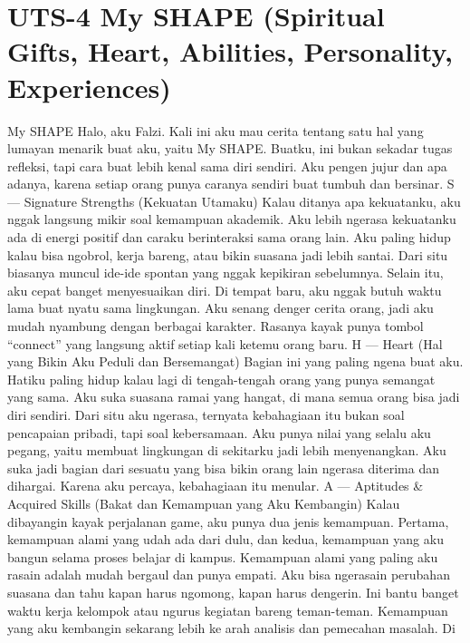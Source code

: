 \documentclass[
  letterpaper,
  DIV=11,
  numbers=noendperiod]{scrreprt}
\begin{document}

\chapter{UTS-4 My SHAPE (Spiritual Gifts, Heart, Abilities, Personality,
Experiences)}\label{uts-4-my-shape-spiritual-gifts-heart-abilities-personality-experiences}

My SHAPE Halo, aku Falzi. Kali ini aku mau cerita tentang satu hal yang
lumayan menarik buat aku, yaitu My SHAPE. Buatku, ini bukan sekadar
tugas refleksi, tapi cara buat lebih kenal sama diri sendiri. Aku pengen
jujur dan apa adanya, karena setiap orang punya caranya sendiri buat
tumbuh dan bersinar. S --- Signature Strengths (Kekuatan Utamaku) Kalau
ditanya apa kekuatanku, aku nggak langsung mikir soal kemampuan
akademik. Aku lebih ngerasa kekuatanku ada di energi positif dan caraku
berinteraksi sama orang lain. Aku paling hidup kalau bisa ngobrol, kerja
bareng, atau bikin suasana jadi lebih santai. Dari situ biasanya muncul
ide-ide spontan yang nggak kepikiran sebelumnya. Selain itu, aku cepat
banget menyesuaikan diri. Di tempat baru, aku nggak butuh waktu lama
buat nyatu sama lingkungan. Aku senang denger cerita orang, jadi aku
mudah nyambung dengan berbagai karakter. Rasanya kayak punya tombol
``connect'' yang langsung aktif setiap kali ketemu orang baru. H ---
Heart (Hal yang Bikin Aku Peduli dan Bersemangat) Bagian ini yang paling
ngena buat aku. Hatiku paling hidup kalau lagi di tengah-tengah orang
yang punya semangat yang sama. Aku suka suasana ramai yang hangat, di
mana semua orang bisa jadi diri sendiri. Dari situ aku ngerasa, ternyata
kebahagiaan itu bukan soal pencapaian pribadi, tapi soal kebersamaan.
Aku punya nilai yang selalu aku pegang, yaitu membuat lingkungan di
sekitarku jadi lebih menyenangkan. Aku suka jadi bagian dari sesuatu
yang bisa bikin orang lain ngerasa diterima dan dihargai. Karena aku
percaya, kebahagiaan itu menular. A --- Aptitudes \& Acquired Skills
(Bakat dan Kemampuan yang Aku Kembangin) Kalau dibayangin kayak
perjalanan game, aku punya dua jenis kemampuan. Pertama, kemampuan alami
yang udah ada dari dulu, dan kedua, kemampuan yang aku bangun selama
proses belajar di kampus. Kemampuan alami yang paling aku rasain adalah
mudah bergaul dan punya empati. Aku bisa ngerasain perubahan suasana dan
tahu kapan harus ngomong, kapan harus dengerin. Ini bantu banget waktu
kerja kelompok atau ngurus kegiatan bareng teman-teman. Kemampuan yang
aku kembangin sekarang lebih ke arah analisis dan pemecahan masalah. Di
\end{document}
